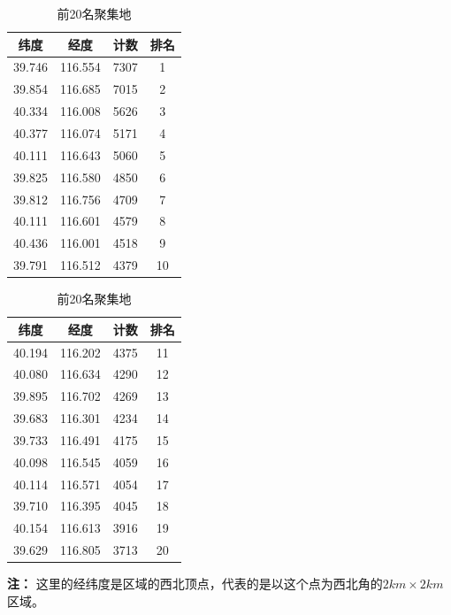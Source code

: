 \documentclass[UTF8]{ctexart}
\begin{document}
\begin{table}[htb]
    \centering
    \caption{前20名聚集地}
    \label{denseTable}
    \begin{minipage}{0.48\textwidth}
        \raggedleft
        \begin{tabular}{cccc}
            \toprule
            纬度\footnotemark & 经度 & 计数 & 排名\\
            \midrule
            39.746 & 116.554 & 7307 & 1\\
            39.854 & 116.685 & 7015 & 2\\
            40.334 & 116.008 & 5626 & 3\\
            40.377 & 116.074 & 5171 & 4\\
            40.111 & 116.643 & 5060 & 5\\
            39.825 & 116.580 & 4850 & 6\\
            39.812 & 116.756 & 4709 & 7\\
            40.111 & 116.601 & 4579 & 8\\
            40.436 & 116.001 & 4518 & 9\\
            39.791 & 116.512 & 4379 & 10\\
            \bottomrule
        \end{tabular}
    \end{minipage}
    \hspace{0.005\textwidth}
    \begin{minipage}{0.48\textwidth}
        \raggedright
        \begin{tabular}{cccc}
            \toprule
            纬度 & 经度 & 计数 & 排名\\
            \midrule
            40.194 & 116.202 & 4375 & 11\\
            40.080 & 116.634 & 4290 & 12\\
            39.895 & 116.702 & 4269 & 13\\
            39.683 & 116.301 & 4234 & 14\\
            39.733 & 116.491 & 4175 & 15\\
            40.098 & 116.545 & 4059 & 16\\
            40.114 & 116.571 & 4054 & 17\\
            39.710 & 116.395 & 4045 & 18\\
            40.154 & 116.613 & 3916 & 19\\
            39.629 & 116.805 & 3713 & 20\\
            \bottomrule
        \end{tabular}
    \end{minipage}
    \begin{minipage}{\textwidth}
        \footnotesize
        \vspace{2pt}
        \textbf{注：} 这里的经纬度是区域的西北顶点，代表的是以这个点为西北角的$2km \times 2km$区域。
    \end{minipage}
\end{table}
\end{document}
